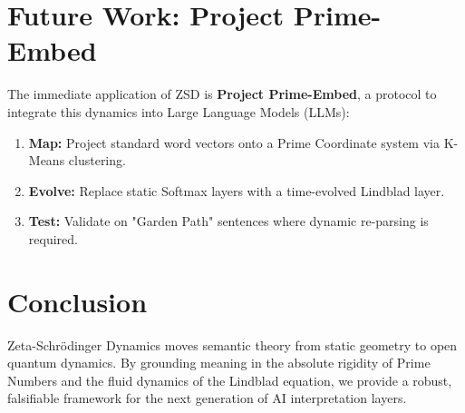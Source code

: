 \documentclass[11pt, a4paper]{article}
\begin{document}
\section{Future Work: Project Prime-Embed}

The immediate application of ZSD is \textbf{Project Prime-Embed}, a protocol to integrate this dynamics into Large Language Models (LLMs):
\begin{enumerate}
    \item \textbf{Map:} Project standard word vectors onto a Prime Coordinate system via K-Means clustering.
    \item \textbf{Evolve:} Replace static Softmax layers with a time-evolved Lindblad layer.
    \item \textbf{Test:} Validate on "Garden Path" sentences where dynamic re-parsing is required.
\end{enumerate}

\section{Conclusion}
Zeta-Schrödinger Dynamics moves semantic theory from static geometry to open quantum dynamics. By grounding meaning in the absolute rigidity of Prime Numbers and the fluid dynamics of the Lindblad equation, we provide a robust, falsifiable framework for the next generation of AI interpretation layers.
\end{document}
